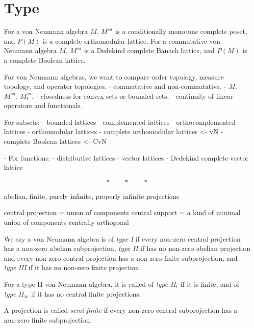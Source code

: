 \documentclass{../../large}
\begin{document}
\begin{prb}
\end{prb}




\section{Type}

For a von Neumann algebra $M$, $M^{sa}$ is a conditionally monotone complete poset, and $P(M)$ is a complete orthomodular lattice.
For a commutative von Neumann algebra $M$, $M^{sa}$ is a Dedekind complete Banach lattice, and $P(M)$ is a complete Boolean lattice.

For von Neumann algebras, we want to compare order topology, measure topology, and operator topologies.
- commutative and non-commutative.
- $M$, $M^{sa}$, $M_1^{sa}$.
- closedness for convex sets or bounded sets.
- continuity of linear operators and functionals.



For subsets:
- bounded lattices
- complemented lattices
- orthocomplemented lattices
- orthomodular lattices
- complete orthomodular lattices <- vN
- complete Boolean lattices <- CvN

- For functions:
- distributive lattices
- vector lattices
- Dedekind complete vector lattice




\[*\qquad *\qquad *\]


abelian, finite, purely infinite, properly infinite projections

central projection = union of components
central support = a kind of minimal union of components
centrally orthogonal

\begin{prb}
We say a von Neumann algebra is of \emph{type I} if every non-zero central projection has a non-zero abelian subprojection, \emph{type II} if has no non-zero abelian projection and every non-zero central projection has a non-zero finite subprojection, and \emph{type III} if it has no non-zero finite projection.

For a type II von Neumann algebra, it is called of \emph{type II$_1$} if it is finite, and of \emph{type II$_\infty$} if it has no central finite projections.

A projection is called \emph{semi-finite} if every non-zero central subprojection has a non-zero finite subprojection.
\end{prb}
\end{document}
